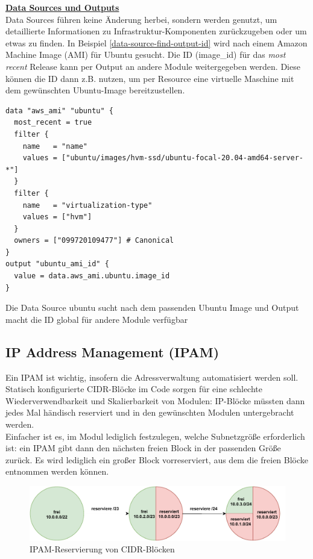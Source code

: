 \textbf{\underline{Data Sources und Outputs}}\\
Data Sources führen keine Änderung herbei, sondern werden genutzt, um detaillierte Informationen zu Infrastruktur-Komponenten zurückzugeben oder um etwas zu finden. In Beispiel \ref{data-source-find-output-id} wird nach einem Amazon Machine Image (AMI) für Ubuntu gesucht. Die ID (image\_id) für das \textit{most recent} Release kann per Output an andere Module weitergegeben werden. Diese können die ID dann z.B. nutzen, um per Resource eine virtuelle Maschine mit dem gewünschten Ubuntu-Image bereitzustellen.
\begin{listing}[h]
\begin{verbatim}
data "aws_ami" "ubuntu" {
  most_recent = true
  filter {
    name   = "name"
    values = ["ubuntu/images/hvm-ssd/ubuntu-focal-20.04-amd64-server-*"]
  }
  filter {
    name   = "virtualization-type"
    values = ["hvm"]
  }
  owners = ["099720109477"] # Canonical
}
output "ubuntu_ami_id" {
  value = data.aws_ami.ubuntu.image_id
}
\end{verbatim}
\caption{Die Data Source \glqq ubuntu\grqq{} sucht nach dem passenden Ubuntu Image und Output macht die ID global für andere Module verfügbar}
\label{data-source-find-output-id}
\end{listing}
\subsection{IP Address Management (IPAM)}
Ein IPAM ist wichtig, insofern die Adressverwaltung automatisiert werden soll. Statisch konfigurierte CIDR-Blöcke im Code sorgen für eine schlechte Wiederverwendbarkeit und Skalierbarkeit von Modulen: IP-Blöcke müssten dann jedes Mal händisch reserviert und in den gewünschten Modulen untergebracht werden.\\
Einfacher ist es, im Modul lediglich festzulegen, welche Subnetzgröße erforderlich ist: ein IPAM gibt dann den nächsten freien Block in der passenden Größe zurück. Es wird lediglich ein großer Block vorreserviert, aus dem die freien Blöcke entnommen werden können.

\begin{figure}[h]
  \centering
  \includegraphics[scale=0.8]{Figures/ipam_cake.pdf}
  \caption{IPAM-Reservierung von CIDR-Blöcken}
  \label{grafik: ipam_ip_reservation}
\end{figure}\FloatBarrier
